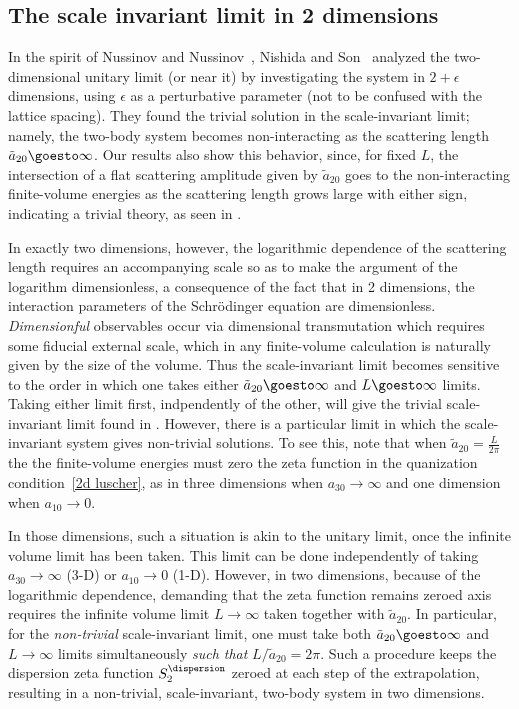 \subsection{The scale invariant limit in 2 dimensions}

In the spirit of Nussinov and Nussinov~\cite{nussinov2004bcs}, Nishida and Son~\cite{Nishida:2006eu} analyzed the two-dimensional unitary limit (or near it) by investigating the system in $2+\epsilon$ dimensions, using $\epsilon$ as a perturbative parameter (not to be confused with the lattice spacing).
They found the trivial solution in the scale-invariant limit; namely, the two-body system becomes non-interacting as the scattering length $\tilde a_{20} \goesto\infty$.
Our results also show this behavior, since, for fixed $L$, the intersection of a flat scattering amplitude given by $\tilde a_{20}$ goes to the non-interacting finite-volume energies as the scattering length grows large with either sign, indicating a trivial theory, as seen in .

In exactly two dimensions, however, the logarithmic dependence of the scattering length requires an accompanying scale so as to make the argument of the logarithm dimensionless, a consequence of the fact that in 2 dimensions, the interaction parameters of the Schr\"odinger equation are dimensionless.
\emph{Dimensionful} observables occur via dimensional transmutation \cite{} which requires some fiducial external scale, which in any finite-volume calculation is naturally given by the size of the volume.
Thus the scale-invariant limit becomes sensitive to the order in which one takes either $\tilde a_{20}\goesto\infty$ and $L\goesto\infty$ limits.
Taking either limit first, indpendently of the other, will give the trivial scale-invariant limit found in \cite{Nishida:2006eu}.
However, there is a particular limit in which the scale-invariant system gives non-trivial solutions.
To see this, note that when $\tilde a_{20}=\frac{L}{2\pi}$ the the finite-volume energies must zero the zeta function in the quanization condition~\eqref{2d luscher}, as in three dimensions when $a_{30}\to\infty$ and one dimension when $a_{10}\to 0$.

In those dimensions, such a situation is akin to the unitary limit, once the infinite volume limit has been taken.
This limit can be done independently of taking $a_{30}\to\infty$ (3-D) or $a_{10}\to0$ (1-D).
However, in two dimensions, because of the logarithmic dependence, demanding that the zeta function remains zeroed axis requires the infinite volume limit $L\to\infty$ taken together with $\tilde a_{20}$.
In particular, for the \emph{non-trivial} scale-invariant limit, one must take both $\tilde a_{20}\goesto \infty$ and $L\to\infty$ limits simultaneously \emph{such that} $L/\tilde a_{20}=2\pi$.
Such a procedure keeps the dispersion zeta function $S^{\dispersion}_2$ zeroed at each step of the extrapolation, resulting in a non-trivial, scale-invariant, two-body system in two dimensions.
